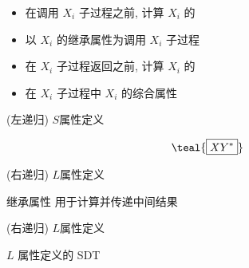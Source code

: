 \begin{frame}{}
  \begin{center}

    \vspace{0.80cm}
    \begin{itemize}
      \centering
      \setlength{\itemsep}{15pt}
      \item 在调用 $X_{i}$ 子过程之前, 计算 $X_{i}$ 的
      \item 以 $X_{i}$ 的继承属性为调用 $X_{i}$ 子过程
      \item 在 $X_{i}$ 子过程返回之前, 计算 $X_{i}$ 的
      \item 在 $X_{i}$ 子过程中 $X_{i}$ 的综合属性
    \end{itemize}
  \end{center}
\end{frame}

\begin{frame}{}
  \begin{center}
    (左递归) $S$属性定义
    \vspace{-0.50cm}
    

    \vspace{-0.60cm}
    \[
      \teal{\boxed{X Y^{\ast}}}
    \]

    (右递归) $L$属性定义
    \vspace{-0.50cm}
    
  \end{center}
\end{frame}

\begin{frame}{}
  \begin{center}
    继承属性  用于计算并传递中间结果

    \vspace{0.50cm}

    \vspace{0.50cm}
  \end{center}
\end{frame}

\begin{frame}{}
  \begin{center}
    (右递归) $L$属性定义
    \vspace{-0.50cm}
    

    \vspace{0.30cm}

    \pause
    \vspace{0.50cm}
    $L$ 属性定义的 SDT
    \vspace{-0.50cm}
    
  \end{center}
\end{frame}

